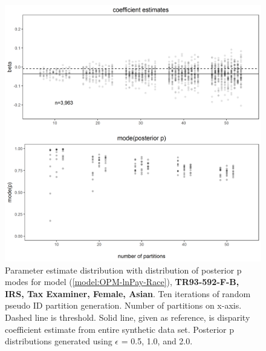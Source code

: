 \documentclass[10pt, letterpaper]{article}
\begin{document}
\begin{spacing}{1.0}
\begin{figure}[]
    \centering
    \includegraphics[width=6in]{images/RacePayDifferentialBetaWithPosteriorDistribution-TR93-592-F-B.png}
    \caption{Parameter estimate distribution with distribution of posterior p modes for model (\ref{model:OPM-lnPay-Race}), \textbf{TR93-592-F-B, IRS, Tax Examiner, Female, Asian}.  Ten iterations of random pseudo ID partition generation.  Number of partitions on x-axis.  Dashed line is threshold.  Solid line, given as reference, is disparity coefficient estimate from entire synthetic data set.  Posterior p distributions generated using $\epsilon$ = 0.5, 1.0, and 2.0.}
    \label{figure:RacePayDifferentialBetaWithPosteriorDistribution-TR93-592-F-B}
\end{figure}

\clearpage


\end{spacing}
\end{document}
